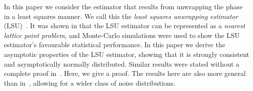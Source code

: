 \documentclass[journal]{IEEEtran}
\begin{document}
In this paper we consider the estimator that results from unwrapping the phase in a least squares manner.  We call this the \emph{least squares unwrapping estimator} (LSU)~\cite{McKilliam2009asilomar_polyest_lattice, McKilliamFrequencyEstimationByPhaseUnwrapping2009}\cite[Chap. 8]{McKilliam2010thesis}.  It was shown in \cite{McKilliam2009asilomar_polyest_lattice, McKilliamFrequencyEstimationByPhaseUnwrapping2009} that the LSU estimator can be represented as a \emph{nearest lattice point problem}, and Monte-Carlo simulations were used to show the LSU estimator's favourable statistical performance. %
In this paper we derive the asymptotic properties of the LSU estimator, showing that it is strongly consistent and asymptotically normally distributed.  Similar results were stated without a complete proof in~\cite{McKilliam_polyphase_est_icassp_2011}.  Here, we give a proof.  The results here are also more general than in~\cite{McKilliam_polyphase_est_icassp_2011}, allowing for a wider class of noise distributions.
\end{document}
